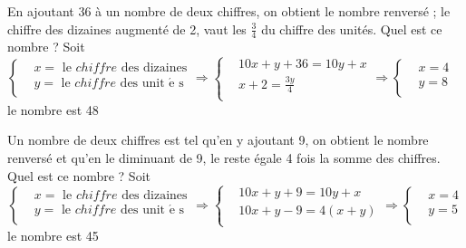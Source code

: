 \begin{solution}
En ajoutant 36 à un nombre de deux chiffres, on obtient le nombre renversé ; le chiffre des dizaines augmenté de 2, vaut les $\frac{3}{4}$ du chiffre des unités. Quel est ce nombre ?
Soit $\left\{ \begin{array}{ll}
  & x=\text{ le }chiffre\text{ des dizaines} \\ 
 & y=\text{ le }chiffre\text{ des unit }\!\!\acute{\mathrm{e}}\!\!\text{ s} \\ 
\end{array} \right.\Rightarrow \left\{ \begin{array}{ll}
  & 10x+y+36=10y+x \\ 
 & x+2=\frac{3y}{4} \\ 
\end{array} \right.\Rightarrow \left\{ \begin{array}{ll}
  & x=4 \\ 
 & y=8 \\ 
\end{array} \right.$ 	le nombre est 48
\end{solution}

\begin{solution}
Un nombre de deux chiffres est tel qu’en y ajoutant 9, on obtient le nombre renversé et qu’en le diminuant de 9, le reste égale 4 fois la somme des chiffres. Quel est ce nombre ?
Soit $$\left\{ \begin{array}{ll}
  & x=\text{ le }chiffre\text{ des dizaines} \\ 
 & y=\text{ le }chiffre\text{ des unit }\!\!\acute{\mathrm{e}}\!\!\text{ s} \\ 
\end{array} \right.\Rightarrow \left\{ \begin{array}{ll}
  & 10x+y+9=10y+x \\ 
 & 10x+y-9=4\left( x+y \right) \\ 
\end{array} \right.\Rightarrow \left\{ \begin{array}{ll}
  & x=4 \\ 
 & y=5 \\ 
\end{array} \right.$$ 	le nombre est 45
\end{solution}


